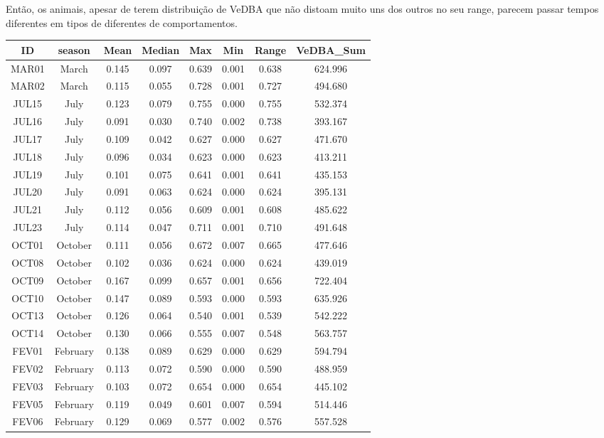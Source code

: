 \documentclass[english,msc,numbers,hidelinks]{coppe}
\begin{document}
  Então, os animais, apesar de terem distribuição de VeDBA que não distoam muito uns dos outros no seu range, parecem passar tempos diferentes em tipos de diferentes de comportamentos.

  \newpage
  \begin{table}[!h]
  \centering
  \begin{tabular}{cccccccc}
  \toprule
  ID & season & Mean & Median & Max & Min & Range & VeDBA\_Sum\\
  \midrule
  MAR01 & March & 0.145 & 0.097 & 0.639 & 0.001 & 0.638 & 624.996\\
  MAR02 & March & 0.115 & 0.055 & 0.728 & 0.001 & 0.727 & 494.680\\
  JUL15 & July & 0.123 & 0.079 & 0.755 & 0.000 & 0.755 & 532.374\\
  JUL16 & July & 0.091 & 0.030 & 0.740 & 0.002 & 0.738 & 393.167\\
  JUL17 & July & 0.109 & 0.042 & 0.627 & 0.000 & 0.627 & 471.670\\
  \addlinespace
  JUL18 & July & 0.096 & 0.034 & 0.623 & 0.000 & 0.623 & 413.211\\
  JUL19 & July & 0.101 & 0.075 & 0.641 & 0.001 & 0.641 & 435.153\\
  JUL20 & July & 0.091 & 0.063 & 0.624 & 0.000 & 0.624 & 395.131\\
  JUL21 & July & 0.112 & 0.056 & 0.609 & 0.001 & 0.608 & 485.622\\
  JUL23 & July & 0.114 & 0.047 & 0.711 & 0.001 & 0.710 & 491.648\\
  \addlinespace
  OCT01 & October & 0.111 & 0.056 & 0.672 & 0.007 & 0.665 & 477.646\\
  OCT08 & October & 0.102 & 0.036 & 0.624 & 0.000 & 0.624 & 439.019\\
  OCT09 & October & 0.167 & 0.099 & 0.657 & 0.001 & 0.656 & 722.404\\
  OCT10 & October & 0.147 & 0.089 & 0.593 & 0.000 & 0.593 & 635.926\\
  OCT13 & October & 0.126 & 0.064 & 0.540 & 0.001 & 0.539 & 542.222\\
  \addlinespace
  OCT14 & October & 0.130 & 0.066 & 0.555 & 0.007 & 0.548 & 563.757\\
  FEV01 & February & 0.138 & 0.089 & 0.629 & 0.000 & 0.629 & 594.794\\
  FEV02 & February & 0.113 & 0.072 & 0.590 & 0.000 & 0.590 & 488.959\\
  FEV03 & February & 0.103 & 0.072 & 0.654 & 0.000 & 0.654 & 445.102\\
  FEV05 & February & 0.119 & 0.049 & 0.601 & 0.007 & 0.594 & 514.446\\
  \addlinespace
  FEV06 & February & 0.129 & 0.069 & 0.577 & 0.002 & 0.576 & 557.528\\
  \bottomrule
  \end{tabular}
  \end{table}
\end{document}
